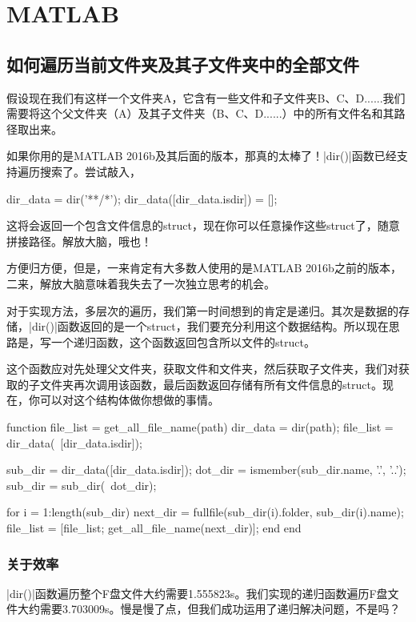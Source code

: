 \chapter{MATLAB}

\section{如何遍历当前文件夹及其子文件夹中的全部文件}

假设现在我们有这样一个文件夹A，它含有一些文件和子文件夹B、C、D......我们需要将这个父文件夹（A）及其子文件夹（B、C、D......）中的所有文件名和其路径取出来。

如果你用的是MATLAB 2016b及其后面的版本，那真的太棒了！\Matlabinline|dir()|函数已经支持遍历搜索了。尝试敲入，

\begin{Matlabcode}
dir_data = dir('**/*');
dir_data([dir_data.isdir]) = [];  %
\end{Matlabcode}

这将会返回一个包含文件信息的struct，现在你可以任意操作这些struct了，随意拼接路径。解放大脑，哦也！

方便归方便，但是，一来肯定有大多数人使用的是MATLAB 2016b之前的版本，二来，解放大脑意味着我失去了一次独立思考的机会。

对于实现方法，多层次的遍历，我们第一时间想到的肯定是递归。其次是数据的存储，\Matlabinline|dir()|函数返回的是一个struct，我们要充分利用这个数据结构。所以现在思路是，写一个递归函数，这个函数返回包含所以文件的struct。

这个函数应对先处理父文件夹，获取文件和文件夹，然后获取子文件夹，我们对获取的子文件夹再次调用该函数，最后函数返回存储有所有文件信息的struct。现在，你可以对这个结构体做你想做的事情。

\begin{Matlabcode}
function file_list = get_all_file_name(path)
    dir_data = dir(path);
    file_list = dir_data(~[dir_data.isdir]);  %
    
    sub_dir = dir_data([dir_data.isdir]);  %
    dot_dir = ismember({sub_dir.name}, {'.', '..'});  %
    sub_dir = sub_dir(~dot_dir);  %
    
    for i = 1:length(sub_dir)
        next_dir = fullfile(sub_dir(i).folder, sub_dir(i).name);  %
        file_list = [file_list; get_all_file_name(next_dir)];  %
    end
end
\end{Matlabcode}

\subsection{关于效率}
\Matlabinline|dir()|函数遍历整个F盘文件大约需要1.555823s。我们实现的递归函数遍历F盘文件大约需要3.703009s。慢是慢了点，但我们成功运用了递归解决问题，不是吗？